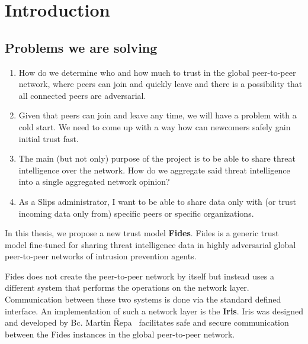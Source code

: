 \chapter{Introduction}
\label{ch:introduction}



\section{Problems we are solving}
\begin{enumerate}
\item How do we determine who and how much to trust in the global peer-to-peer network, where peers can join and quickly leave and there is a possibility that all connected peers are adversarial.
\item Given that peers can join and leave any time, we will have a problem with a cold start. We need to come up with a way how can newcomers safely gain initial trust fast.
\item The main (but not only) purpose of the project is to be able to share threat intelligence over the network. How do we aggregate said threat intelligence into a single aggregated network opinion?
\item As a Slips administrator, I want to be able to share data only with (or trust incoming data only from) specific peers or specific organizations.
\end{enumerate}



In this thesis, we propose a new trust model \textbf{Fides}.
Fides is a generic trust model fine-tuned for sharing threat intelligence data in highly adversarial global peer-to-peer networks of intrusion prevention agents.

Fides does not create the peer-to-peer network by itself but instead uses a different system that performs the operations on the network layer.
Communication between these two systems is done via the standard defined interface.
An implementation of such a network layer is the \textbf{Iris}. Iris was designed and developed by Bc. Martin Řepa~\cite{nl} facilitates safe and secure communication between the Fides instances in the global peer-to-peer network.


